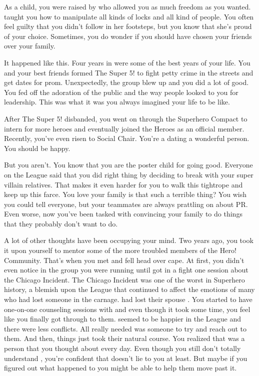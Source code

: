 \documentclass[char]{LRSguildcamp1}
\begin{document}
\name{\cYoungest{}}

As a child, you were raised by \cGrandma{} who allowed you as much freedom as you wanted. \cGrandma{} taught you how to manipulate all kinds of locks and all kind of people. You often feel guilty that you didn't follow in her footsteps, but you know that she's proud of your choice. Sometimes, you do wonder if you should have chosen your friends over your family. 

It happened like this. Four years in \pSuperSchool{} were some of the best years  of your life. You and your best friends formed The Super 5! to fight petty crime in the streets and get dates for prom. Unexpectedly, the group blew up and you did a lot of good. You fed off the adoration of the public and the way people looked to you for leadership. This was what it was you always imagined your life to be like.  
 
After The Super 5! disbanded, you went on through the Superhero Compact to intern for more heroes and eventually joined the Heroes as an official member. Recently, you've even risen to Social Chair. You're a dating a wonderful person. You should be happy. 

But you aren't. You know that you are the poster child for going good.  Everyone on the League said that you did right thing by deciding to break with your super villain relatives. That makes it even harder for you to walk this tightrope and keep up this farce. You love your family is that such a terrible thing? You wish you could tell everyone, but your teammates are always prattling on about PR.  Even worse, now you've been tasked with convincing your family to do things that they probably don't want to do. 

A lot of other thoughts have been occupying your mind. Two years ago, you took it upon yourself to mentor some of the more troubled members of the Hero! Community. That's when you met \cYS{} and fell head over cape. At first, you didn't even notice \cYS{} in the group you were running until \cYS{} got in a fight one session about the Chicago Incident. The Chicago Incident was one of the worst in Superhero history, a blemish upon the League that continued to affect the emotions of many who had lost someone in the carnage. \cA{} had lost their spouse \cAS{}. You started to have one-on-one counseling sessions with \cYS{} and even though it took some time, you feel like you finally got through to them. \cYS{} seemed to be happier in the League and there were less conflicts.  All\cYS{} really needed was someone to try and reach out to them. And then, things just took their natural course. You realized that \cYS{} was a person that you thought about every day. Even though you still don't totally understand  , you're confident that \cYS{} doesn't lie to you at least. But maybe if you figured out what happened to \cYS{} you might be able to help them move past it. 
 
\end{document}
